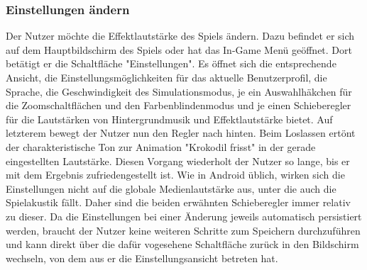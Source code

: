 \subsubsection{Einstellungen ändern}
Der Nutzer möchte die Effektlautstärke des Spiels ändern. Dazu befindet
er sich auf dem Hauptbildschirm des Spiels oder hat das In-Game Menü 
geöffnet. Dort betätigt er die Schaltfläche "Einstellungen".
Es öffnet sich die entsprechende Ansicht, die Einstellungsmöglichkeiten
für das aktuelle Benutzerprofil, die Sprache, die Geschwindigkeit des Simulationsmodus, je
ein Auswahlhäkchen für die Zoomschaltflächen und den Farbenblindenmodus und je einen Schieberegler
für die Lautstärken von Hintergrundmusik und Effektlautstärke bietet.
Auf letzterem bewegt der Nutzer nun den Regler nach hinten. Beim Loslassen
ertönt der charakteristische Ton zur Animation "Krokodil frisst" in der
gerade eingestellten Lautstärke. Diesen Vorgang wiederholt der Nutzer
so lange, bis er mit dem Ergebnis zufriedengestellt ist. Wie in Android 
üblich, wirken sich die Einstellungen nicht auf die globale Medienlautstärke
aus, unter die auch die Spielakustik fällt. Daher sind die beiden erwähnten
Schieberegler immer relativ zu dieser. Da die Einstellungen
bei einer Änderung jeweils automatisch persistiert werden, braucht der
Nutzer keine weiteren Schritte zum Speichern durchzuführen und kann
direkt über die dafür vogesehene Schaltfläche zurück in den Bildschirm
wechseln, von dem aus er die Einstellungsansicht betreten hat.

